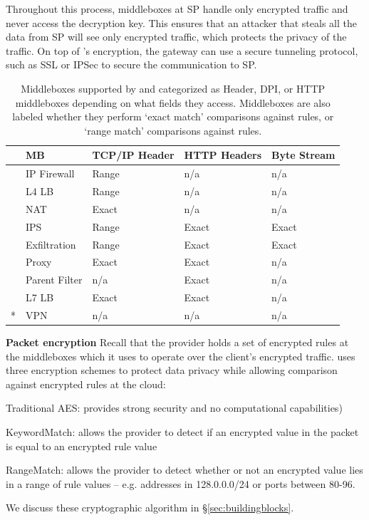 Throughout this process, middleboxes at SP handle only encrypted traffic and never access the decryption key. This ensures
that an attacker that steals all the data from SP will  see only encrypted traffic, which protects the privacy of the 
traffic. 
On top of \sys's encryption, the gateway can use a secure tunneling protocol, such as SSL or IPSec to secure the communication to SP.

\begin{table}
\centering
\small
\hspace{-2pt}
\begin{tabular}{l|l|p{.45in}|p{.45in}|p{.45in}}
&{\bf MB}&{\bf TCP/IP Header}&{\bf HTTP Headers}&{\bf Byte Stream}\\

\hline

\parbox[t]{1mm}{}
&IP Firewall&Range&n/a&n/a\\
&L4 LB&Range&n/a&n/a\\
&NAT&Exact&n/a&n/a\\
\hline


\parbox[t]{1mm}{}
&IPS&Range&Exact&Exact\\
&Exfiltration&Range&Exact&Exact\\
\hline

\parbox[t]{1mm}{}
&Proxy&Exact&Exact&n/a\\
&Parent Filter&n/a&Exact&n/a\\
&L7 LB&Exact&Exact&n/a\\
\hline
*&VPN&n/a&n/a&n/a\\

\end{tabular}
\caption[]{Middleboxes supported by \sys and categorized as Header, DPI, or HTTP middleboxes depending on what fields they access. Middleboxes are also labeled whether they perform `exact match' comparisons against rules, or `range match' comparisons against rules.\label{tbl:mbreqs}}

\end{table}



\noindent\textbf{Packet encryption}
Recall that the provider holds a set of encrypted rules at the middleboxes which it uses to operate over the client's encrypted traffic.
\sys uses three encryption schemes to protect data privacy while allowing comparison against encrypted rules at the cloud: 
\begin{myitemize}
\item Traditional AES: provides strong security and no computational capabilities)
\item KeywordMatch:  allows the provider to detect if an encrypted value in the packet is equal to an encrypted rule value
\item RangeMatch: allows the provider to detect whether or not an encrypted value lies in a range of rule values -- e.g. addresses in 128.0.0.0/24 or ports between 80-96.
\end{myitemize}
We discuss these cryptographic algorithm in \S\ref{sec:buildingblocks}.


